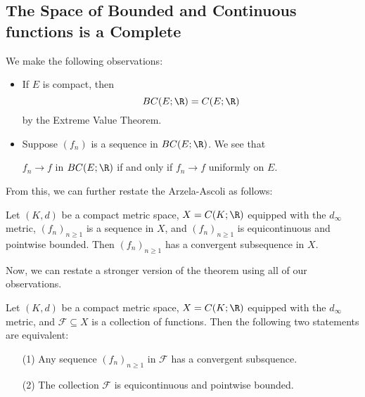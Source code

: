 \subsection{The Space of Bounded and Continuous functions is a Complete}

We make the following observations:

\begin{itemize}
    \item If \( E  \) is compact, then 
        \[ BC(E ; \R ) = C (E ; \R )  \]
        by the Extreme Value Theorem.
    \item Suppose \( ({f}_{n})  \) is a sequence in \( BC(E;\R) \). We see that  
        \begin{center}
            \( {f}_{n} \to f  \) in \( BC(E;\R) \) if and only if \( {f}_{n} \to f  \) uniformly on \( E  \).
        \end{center}
\end{itemize} 

From this, we can further restate the Arzela-Ascoli as follows:

\begin{theorem}
    Let \( (K,d) \) be a compact metric space, \( X = C(K ; \R ) \) equipped with the \( {d}_{\infty } \) metric, \( ({f}_{n})_{n \geq 1} \) is a sequence in \( X  \), and \( ({f}_{n})_{n \geq 1}  \) is equicontinuous and pointwise bounded. Then \( ({f}_{n})_{n \geq 1 } \) has a convergent subsequence in \( X  \).
\end{theorem}

Now, we can restate a stronger version of the theorem using all of our observations.

\begin{theorem}
    Let \( (K,d) \) be a compact metric space, \( X = C(K;\R) \) equipped with the \( {d}_{\infty } \) metric, and \( \mathcal{F} \subseteq  X  \) is a collection of functions. Then the following two statements are equivalent:
    \begin{enumerate}
        \item[(1)] Any sequence \( ({f}_{n})_{n \geq 1}  \) in \( \mathcal{F} \) has a convergent subsquence.
        \item[(2)] The collection \( \mathcal{F} \) is equicontinuous and pointwise bounded.
    \end{enumerate}
\end{theorem}

